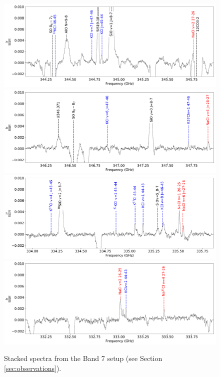 \documentclass[twocolumn]{aastex62}
\begin{document}
\begin{figure}[!htp]
\includegraphics[scale=1,width=5.5in]{figures/color_labels_OrionSourceI_B7.lb_spw0_robust0.5.pdf}
\includegraphics[scale=1,width=5.5in]{figures/color_labels_OrionSourceI_B7.lb_spw1_robust0.5.pdf}
\includegraphics[scale=1,width=5.5in]{figures/color_labels_OrionSourceI_B7.lb_spw2_robust0.5.pdf}
\includegraphics[scale=1,width=5.5in]{figures/color_labels_OrionSourceI_B7.lb_spw3_robust0.5.pdf}
\caption{Stacked spectra from the Band 7 setup (see Section \ref{sec:observations}).}
\label{fig:spectrab7}
\end{figure}
\end{document}
